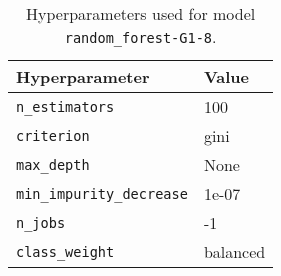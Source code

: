 \begin{table}[H]
\centering
\begin{tabularx}{0.48\textwidth}{|X|l|}
\hline
Hyperparameter & Value \\
\hline
\texttt{n\_estimators} & 100 \\
\texttt{criterion} & gini \\
\texttt{max\_depth} & None \\
\texttt{min\_impurity\_decrease} & 1e-07 \\
\texttt{n\_jobs} & -1 \\
\texttt{class\_weight} & balanced \\
\hline
\end{tabularx}
\caption{Hyperparameters used for model \texttt{random\_forest-G1-8}.}
\label{tab:hyperparameters_best_random_forest}

\end{table}
